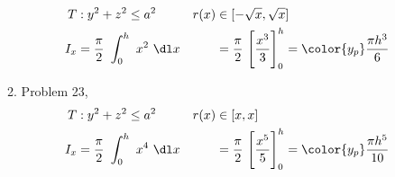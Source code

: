 \begin{enumerate}
\begin{enumerate}
                      \begin{align}
                           T       & : y^2 + z^2 \leq a^2                  &
                           r(x)    & \in [-\sqrt{x}, \sqrt{x}]               \\
                           I_x     & = \frac{\pi}{2}\ \int_{0}^{h}\ x^2
                           \ \dl x &
                                   & = \frac{\pi}{2}\ \Bigg[ \frac{x^3}{3}
                                \Bigg]_{0}^{h}
                           = \color{y_p} \frac{\pi h^3}{6}
                      \end{align}
                \item Problem 23,
                      \begin{align}
                           T       & : y^2 + z^2 \leq a^2                  &
                           r(x)    & \in [x, x]               \\
                           I_x     & = \frac{\pi}{2}\ \int_{0}^{h}\ x^4
                           \ \dl x &
                                   & = \frac{\pi}{2}\ \Bigg[ \frac{x^5}{5}
                                \Bigg]_{0}^{h}
                           = \color{y_p} \frac{\pi h^5}{10}
                      \end{align}
           \end{enumerate}


\end{enumerate}